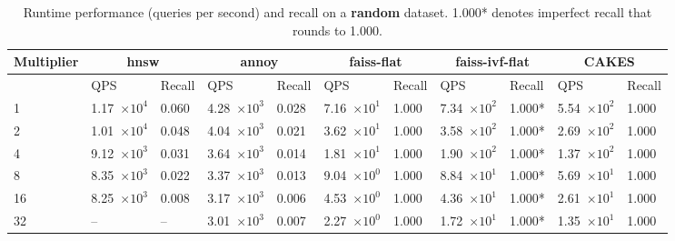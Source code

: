 \begin{table}[!t]
    \caption{Runtime performance (queries per second) and recall on a \textbf{random} dataset. 1.000* denotes imperfect recall that rounds to 1.000.}
    \label{table:results:ann-random}
    \vskip 0.15in
    \begin{center}
        \begin{small}
            \begin{sc}
                \begin{tabular}{|l|p{1.2cm}|p{0.8cm}|p{1.2cm}|p{0.8cm}|p{1.2cm}|p{0.8cm}|p{1.2cm}|p{0.8cm}|p{1.2cm}|p{0.8cm}|}
                    \hline
                    \textbf{Multiplier}  & \multicolumn{2}{|c|}{\textbf{hnsw}}  & \multicolumn{2}{|c|}{\textbf{annoy}} & \multicolumn{2}{|c|}{\textbf{faiss-flat}} & \multicolumn{2}{|c|}{\textbf{faiss-ivf-flat}}  & \multicolumn{2}{|c|}{\textbf{CAKES}} \\
                    \hline
                    &             QPS & Recall        & QPS & Recall      & QPS & Recall       & QPS & Recall    & QPS & Recall    \\
                    \hline
                    1  & 1.17~$\times10^{4}$ & 0.060 & 4.28~$\times10^{3}$ & 0.028 & 7.16~$\times10^{1}$ & 1.000 & 7.34~$\times10^{2}$ & 1.000* & 5.54~$\times10^{2}$ & 1.000 \\
                    \hline
                    2  & 1.01~$\times10^{4}$ & 0.048 & 4.04~$\times10^{3}$ & 0.021 & 3.62~$\times10^{1}$ & 1.000 & 3.58~$\times10^{2}$ & 1.000* & 2.69~$\times10^{2}$ & 1.000 \\
                    \hline
                    4  & 9.12~$\times10^{3}$ & 0.031 & 3.64~$\times10^{3}$ & 0.014 & 1.81~$\times10^{1}$ & 1.000 & 1.90~$\times10^{2}$ & 1.000* & 1.37~$\times10^{2}$ & 1.000 \\
                    \hline
                    8  & 8.35~$\times10^{3}$ & 0.022 & 3.37~$\times10^{3}$ & 0.013 & 9.04~$\times10^{0}$ & 1.000 & 8.84~$\times10^{1}$ & 1.000* & 5.69~$\times10^{1}$ & 1.000 \\
                    \hline
                    16 & 8.25~$\times10^{3}$ & 0.008 & 3.17~$\times10^{3}$ & 0.006 & 4.53~$\times10^{0}$ & 1.000 & 4.36~$\times10^{1}$ & 1.000* & 2.61~$\times10^{1}$ & 1.000 \\
                    \hline
                    32 & --                  & --    & 3.01~$\times10^{3}$ & 0.007 & 2.27~$\times10^{0}$ & 1.000 & 1.72~$\times10^{1}$ & 1.000* & 1.35~$\times10^{1}$ & 1.000 \\
                    \hline
                \end{tabular}
            \end{sc}
        \end{small}
    \end{center}
    \vskip -0.1in
\end{table}

